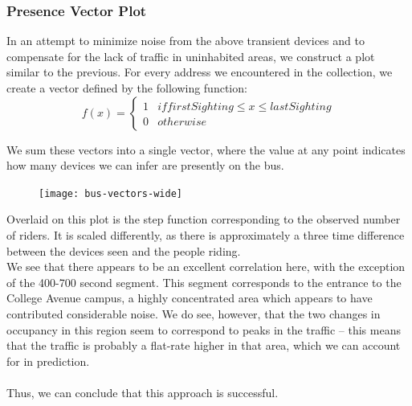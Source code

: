 \documentclass[letterpaper,abstract=on,titlepage=false]{scrreprt}
\begin{document}
	\subsubsection*{Presence Vector Plot}
		In an attempt to minimize noise from the above transient devices and to compensate for the lack of traffic in uninhabited areas, we construct a plot similar to the previous.
		For every address we encountered in the collection, we create a vector defined by the following function:
		\begin{displaymath}
		f(x) = \left\{
			\begin{array}{lr}
			1 & if firstSighting \le x \le lastSighting\\
			0 & otherwise
			\end{array}
		\right.
		\end{displaymath}

		We sum these vectors into a single vector, where the value at any point indicates how many devices we can infer are presently on the bus.

		\begin{figure}[H]
		\texttt{[image: bus-vectors-wide]}
		\centering
		\end{figure}

		Overlaid on this plot is the step function corresponding to the observed number of riders.
		It is scaled differently, as there is approximately a three time difference between the devices seen and the people riding.
		\\
		We see that there appears to be an excellent correlation here, with the exception of the 400-700 second segment.
		This segment corresponds to the entrance to the College Avenue campus, a highly concentrated area which appears to have contributed considerable noise.
		We do see, however, that the two changes in occupancy in this region seem to correspond to peaks in the traffic -- this means that the traffic is probably a flat-rate higher in that area, which we can account for in prediction.
		\\\\
		Thus, we can conclude that this approach is successful.

\end{document}
